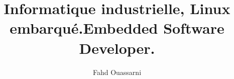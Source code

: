 
\author{Fahd Ouassarni}

\ifdefined\iscv
\title{Informatique industrielle, Linux embarqué.}
\else\fi

\ifdefined\isresume
\title{Embedded Software Developer.}
\else\fi

\address{6 Boulevard Mar\'echal Juin\\
         14000 CAEN}

\maketitle
